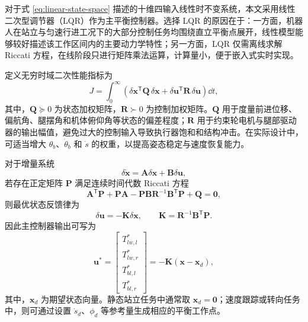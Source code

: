 对于式 \eqref{eq:linear-state-space} 描述的十维四输入线性时不变系统，本文采用线性二次型调节器（LQR）作为主平衡控制器\cite{klemm2020lqr}。选择 LQR 的原因在于：一方面，机器人在站立与匀速行进工况下的大部分控制任务均围绕直立平衡点展开，线性模型能够较好描述该工作区间内的主要动力学特性；另一方面，LQR 仅需离线求解 Riccati 方程，在线阶段只进行矩阵乘法运算，计算量小，便于嵌入式实时实现。

定义无穷时域二次性能指标为
\begin{equation}
  J =
  \int_{0}^{\infty}
  \left(
    \delta \boldsymbol{x}^{\mathsf{T}}\boldsymbol{Q}\,\delta \boldsymbol{x}
    +
    \delta \boldsymbol{u}^{\mathsf{T}}\boldsymbol{R}\,\delta \boldsymbol{u}
  \right)\dd t,
  \label{eq:lqr-cost}
\end{equation}
其中，$\boldsymbol{Q} \succeq 0$ 为状态加权矩阵，$\boldsymbol{R} \succ 0$ 为控制加权矩阵。$\boldsymbol{Q}$ 用于度量前进位移、偏航角、腿摆角和机体俯仰角等状态的偏差程度；$\boldsymbol{R}$ 用于约束轮电机与腿部驱动器的输出幅值，避免过大的控制输入导致执行器饱和和结构冲击。在实际设计中，可适当增大 $\theta_b$、$\dot{\theta}_b$ 和 $\dot{s}$ 的权重，以提高姿态稳定与速度恢复能力。

对于增量系统
\begin{equation}
  \delta \dot{\boldsymbol{x}}
  =
  \boldsymbol{A}\delta \boldsymbol{x}
  +
  \boldsymbol{B}\delta \boldsymbol{u},
  \label{eq:lqr-system}
\end{equation}
若存在正定矩阵 $\boldsymbol{P}$ 满足连续时间代数 Riccati 方程
\begin{equation}
  \boldsymbol{A}^{\mathsf{T}}\boldsymbol{P}
  +
  \boldsymbol{P}\boldsymbol{A}
  -
  \boldsymbol{P}\boldsymbol{B}\boldsymbol{R}^{-1}\boldsymbol{B}^{\mathsf{T}}\boldsymbol{P}
  +
  \boldsymbol{Q}
  =
  \boldsymbol{0},
  \label{eq:riccati}
\end{equation}
则最优状态反馈律为
\begin{equation}
  \delta \boldsymbol{u}
  =
  -\boldsymbol{K}\delta \boldsymbol{x},
  \qquad
  \boldsymbol{K} =
  \boldsymbol{R}^{-1}\boldsymbol{B}^{\mathsf{T}}\boldsymbol{P}.
  \label{eq:lqr-law}
\end{equation}
因此主控制器输出可写为
\begin{equation}
  \boldsymbol{u}^{\ast}
  =
  \begin{bmatrix}
    T_{lw,l}^{\ast} \\
    T_{lw,r}^{\ast} \\
    T_{bl,l}^{\ast} \\
    T_{bl,r}^{\ast}
  \end{bmatrix}
  =
  -
  \boldsymbol{K}
  \left(
    \boldsymbol{x} - \boldsymbol{x}_d
  \right),
  \label{eq:lqr-output}
\end{equation}
其中，$\boldsymbol{x}_d$ 为期望状态向量。静态站立任务中通常取 $\boldsymbol{x}_d = \boldsymbol{0}$；速度跟踪或转向任务中，则可通过设置 $\dot{s}_d$、$\phi_d$ 等参考量生成相应的平衡工作点。

